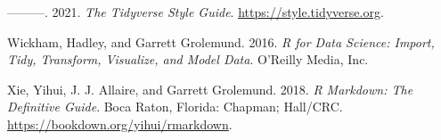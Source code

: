 \documentclass[
  letterpaper,
]{krantz}
\newlength{\cslhangindent}
\newenvironment{CSLReferences}[2] %
 {\begin{list}{}{%
  \setlength{\itemindent}{0pt}
  \setlength{\leftmargin}{0pt}
  \setlength{\parsep}{0pt}
  \ifodd #1
   \setlength{\leftmargin}{\cslhangindent}
   \setlength{\itemindent}{-1\cslhangindent}
  \fi
  \setlength{\itemsep}{#2\baselineskip}}}
 {\end{list}}
\begin{document}
\begin{CSLReferences}{1}{0}
---------. 2021. \emph{The Tidyverse Style Guide}.
\url{https://style.tidyverse.org}.

Wickham, Hadley, and Garrett Grolemund. 2016. \emph{R for Data Science:
Import, Tidy, Transform, Visualize, and Model Data}. {O'Reilly Media,
Inc.}

Xie, Yihui, J. J. Allaire, and Garrett Grolemund. 2018. \emph{R
Markdown: The Definitive Guide}. Boca Raton, Florida: Chapman; Hall/CRC.
\url{https://bookdown.org/yihui/rmarkdown}.

\end{CSLReferences}



\backmatter
\printindex
\end{document}

